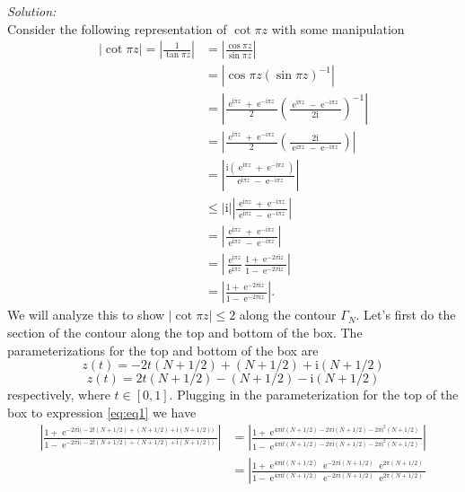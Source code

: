 \documentclass[10pt]{amsart}
\newcommand{\I}{\mathrm{i}}
\DeclareMathOperator{\E}{e}
\theoremstyle{nonumberplain}
\begin{document}
\begin{enumerate}[label={\bf {\arabic*}:}]
\begin{enumerate}
\noindent
\textit{Solution:} \\
Consider the following representation of $\cot \pi z$ with some manipulation
\begin{align}
| \cot \pi z | = \left| \frac 1 {\tan \pi z} \right| &= \left| \frac {\cos \pi z} {\sin \pi z} \right| \nonumber \\
	&= \left| \cos \pi z ( \sin \pi z )^{-1} \right| \nonumber \\
	&= \left| \frac {\E^{\I \pi z} + \E^{-\I \pi z} }{2} \left( \frac {\E^{\I \pi z} - \E^{-\I \pi z} }{2\I} \right)^{-1} \right| \nonumber \\
	&= \left| \frac {\E^{\I \pi z} + \E^{-\I \pi z} }{2} \left( \frac {2\I} {\E^{\I \pi z} - \E^{-\I \pi z} } \right) \right| \nonumber \\
	&= \left| \frac {\I \left( \E^{\I \pi z} + \E^{-\I \pi z} \right) } {\E^{\I \pi z} - \E^{-\I \pi z} } \right| \nonumber \\
	&\leq |\I | \left| \frac { \E^{\I \pi z} + \E^{-\I \pi z} } {\E^{\I \pi z} - \E^{-\I \pi z} } \right| \nonumber \\
	&= \left| \frac { \E^{\I \pi z} + \E^{-\I \pi z} } {\E^{\I \pi z} - \E^{-\I \pi z} } \right| \nonumber \\
	&= \left| \frac {\E^{\I \pi z}} {\E^{\I \pi z}} \frac { 1 + \E^{- 2 \pi \I z} } {1 - \E^{-2 \pi \I z} } \right| \nonumber \\
	&= \left| \frac { 1 + \E^{- 2 \pi \I z} } {1 - \E^{-2 \pi \I z} } \right|.
\label{eq:eq1}
\end{align}
We will analyze this to show $|\cot \pi z| \leq 2$ along the contour $\Gamma_N$.
Let's first do the section of the contour along the top and bottom of the box.
The parameterizations for the top and bottom of the box are
$$z(t) = -2t(N + 1/2) + (N + 1/2) + \I (N + 1/2)$$
$$z(t) = 2t(N + 1/2) - (N + 1/2) - \I (N + 1/2)$$
respectively, where $t \in [0,1]$.
Plugging in the parameterization for the top of the box to expression \eqref{eq:eq1} we have
\begin{align*}
\left|
	\frac
	{1 + \E^{-2 \pi \I \big( -2t(N + 1/2) + (N + 1/2) + \I (N + 1/2) \big) } }
	{1 - \E^{-2 \pi \I \big( -2t(N + 1/2) + (N + 1/2) + \I (N + 1/2) \big) } }
\right|
&= \left|
	\frac
	{1 + \E^{4 \pi \I t(N + 1/2) -2 \pi \I (N + 1/2) -2 \pi \I^2 (N + 1/2) } }
	{1 - \E^{4 \pi \I t(N + 1/2) -2 \pi \I (N + 1/2) -2 \pi \I^2 (N + 1/2) } }
\right| \\
&= \left|
	\frac
	{1 + \E^{4 \pi \I t(N + 1/2)} \E^{-2 \pi \I (N + 1/2)} \E^{2 \pi (N + 1/2) } }
	{1 - \E^{4 \pi \I t(N + 1/2)} \E^{-2 \pi \I (N + 1/2)} \E^{2 \pi (N + 1/2) } }

\end{align*}
\end{enumerate}
\end{enumerate}
\end{document}
